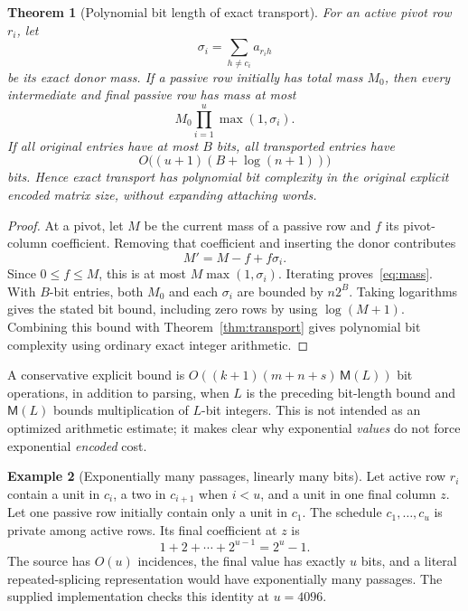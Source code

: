\documentclass[11pt]{article}
\newtheorem{theorem}{Theorem}[section]
\theoremstyle{definition}\newtheorem{definition}[theorem]{Definition}
\newtheorem{example}[theorem]{Example}
\theoremstyle{remark}\newtheorem{remark}[theorem]{Remark}
\begin{document}
\begin{theorem}[Polynomial bit length of exact transport]
\label{thm:bits}
For an active pivot row $r_i$, let
\[
 \sigma_i=\sum_{h\ne c_i}a_{r_i h}
\]
be its exact donor mass. If a passive row initially has total mass $M_0$, then every intermediate and final passive row has mass at most
\begin{equation}
 M_0\prod_{i=1}^u\max(1,\sigma_i).
 \label{eq:mass}
\end{equation}
If all original entries have at most $B$ bits, all transported entries have
\[
 O\bigl((u+1)(B+\log(n+1))\bigr)
\]
bits. Hence exact transport has polynomial bit complexity in the original explicit encoded matrix size, without expanding attaching words.
\end{theorem}
\begin{proof}
At a pivot, let $M$ be the current mass of a passive row and $f$ its pivot-column coefficient. Removing that coefficient and inserting the donor contributes
\[
 M'=M-f+f\sigma_i.
\]
Since $0\leq f\leq M$, this is at most $M\max(1,\sigma_i)$. Iterating proves~\eqref{eq:mass}. With $B$-bit entries, both $M_0$ and each $\sigma_i$ are bounded by $n2^B$. Taking logarithms gives the stated bit bound, including zero rows by using $\log(M+1)$. Combining this bound with Theorem~\ref{thm:transport} gives polynomial bit complexity using ordinary exact integer arithmetic.
\end{proof}

A conservative explicit bound is $O((k+1)(m+n+s)\,\mathsf M(L))$ bit operations, in addition to parsing, when $L$ is the preceding bit-length bound and $\mathsf M(L)$ bounds multiplication of $L$-bit integers. This is not intended as an optimized arithmetic estimate; it makes clear why exponential \emph{values} do not force exponential \emph{encoded} cost.

\begin{example}[Exponentially many passages, linearly many bits]
\label{ex:chain}
Let active row $r_i$ contain a unit in $c_i$, a two in $c_{i+1}$ when $i<u$, and a unit in one final column $z$. Let one passive row initially contain only a unit in $c_1$. The schedule $c_1,\ldots,c_u$ is private among active rows. Its final coefficient at $z$ is
\[
 1+2+\cdots+2^{u-1}=2^u-1.
\]
The source has $O(u)$ incidences, the final value has exactly $u$ bits, and a literal repeated-splicing representation would have exponentially many passages. The supplied implementation checks this identity at $u=4096$.
\end{example}
\end{document}

